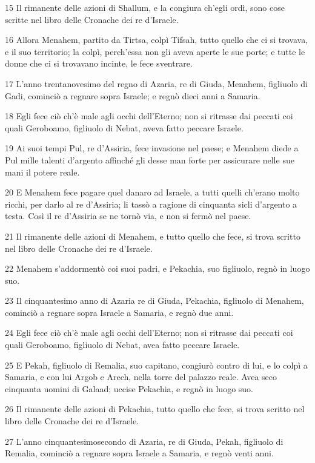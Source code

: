 \par 15 Il rimanente delle azioni di Shallum, e la congiura ch'egli ordì, sono cose scritte nel libro delle Cronache dei re d'Israele.
\par 16 Allora Menahem, partito da Tirtsa, colpì Tifsah, tutto quello che ci si trovava, e il suo territorio; la colpì, perch'essa non gli aveva aperte le sue porte; e tutte le donne che ci si trovavano incinte, le fece sventrare.
\par 17 L'anno trentanovesimo del regno di Azaria, re di Giuda, Menahem, figliuolo di Gadi, cominciò a regnare sopra Israele; e regnò dieci anni a Samaria.
\par 18 Egli fece ciò ch'è male agli occhi dell'Eterno; non si ritrasse dai peccati coi quali Geroboamo, figliuolo di Nebat, aveva fatto peccare Israele.
\par 19 Ai suoi tempi Pul, re d'Assiria, fece invasione nel paese; e Menahem diede a Pul mille talenti d'argento affinché gli desse man forte per assicurare nelle sue mani il potere reale.
\par 20 E Menahem fece pagare quel danaro ad Israele, a tutti quelli ch'erano molto ricchi, per darlo al re d'Assiria; li tassò a ragione di cinquanta sicli d'argento a testa. Così il re d'Assiria se ne tornò via, e non si fermò nel paese.
\par 21 Il rimanente delle azioni di Menahem, e tutto quello che fece, si trova scritto nel libro delle Cronache dei re d'Israele.
\par 22 Menahem s'addormentò coi suoi padri, e Pekachia, suo figliuolo, regnò in luogo suo.
\par 23 Il cinquantesimo anno di Azaria re di Giuda, Pekachia, figliuolo di Menahem, cominciò a regnare sopra Israele a Samaria, e regnò due anni.
\par 24 Egli fece ciò ch'è male agli occhi dell'Eterno; non si ritrasse dai peccati coi quali Geroboamo, figliuolo di Nebat, avea fatto peccare Israele.
\par 25 E Pekah, figliuolo di Remalia, suo capitano, congiurò contro di lui, e lo colpì a Samaria, e con lui Argob e Arech, nella torre del palazzo reale. Avea seco cinquanta uomini di Galaad; uccise Pekachia, e regnò in luogo suo.
\par 26 Il rimanente delle azioni di Pekachia, tutto quello che fece, si trova scritto nel libro delle Cronache dei re d'Israele.
\par 27 L'anno cinquantesimosecondo di Azaria, re di Giuda, Pekah, figliuolo di Remalia, cominciò a regnare sopra Israele a Samaria, e regnò venti anni.
